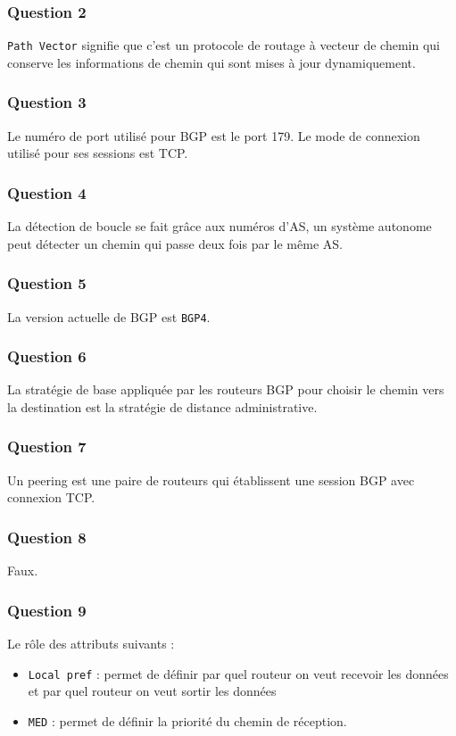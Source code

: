 \documentclass[12pt, a4paper]{article}
\begin{document}
    \subsubsection{Question 2}
    \texttt{Path Vector} signifie que c'est un protocole de routage à vecteur de 
    chemin qui conserve les informations de chemin qui sont mises à jour dynamiquement. 

    \subsubsection{Question 3}
    Le numéro de port utilisé pour BGP est le port 179. Le mode de connexion utilisé
    pour ses sessions est TCP. 

    \subsubsection{Question 4}
    La détection de boucle se fait grâce aux numéros d'AS, un système autonome peut
    détecter un chemin qui passe deux fois par le même AS. 

    \subsubsection{Question 5}
    La version actuelle de BGP est \texttt{BGP4}.

    \subsubsection{Question 6}
    La stratégie de base appliquée par les routeurs BGP pour choisir le chemin
    vers la destination est la stratégie de distance administrative.

    \subsubsection{Question 7}
    Un peering est une paire de routeurs qui établissent une session BGP avec
    connexion TCP. 

    \subsubsection{Question 8}
    Faux. 

    \subsubsection{Question 9}
    Le rôle des attributs suivants : 
    \begin{itemize}
        \item \texttt{Local pref} : permet de définir par quel routeur on veut recevoir les données et par quel routeur on veut sortir les données
        \item \texttt{MED} : permet de définir la priorité du chemin de réception. 
    \end{itemize}
\end{document}
